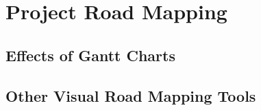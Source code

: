 \section{Project Road Mapping\label{sec:literatureReview:roadmap}}

\subsection{Effects of Gantt Charts\label{sec:literatureReview:roadmap:gantt}}

\subsection{Other Visual Road Mapping Tools\label{sec:literatureReview:roadmap:otherTools}}
